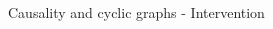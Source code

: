 \begin{frame}{Causality and cyclic graphs - Intervention}
\begin{columns}
\begin{column}{0.65\textwidth}



\end{column}
\end{columns}
\end{frame}
